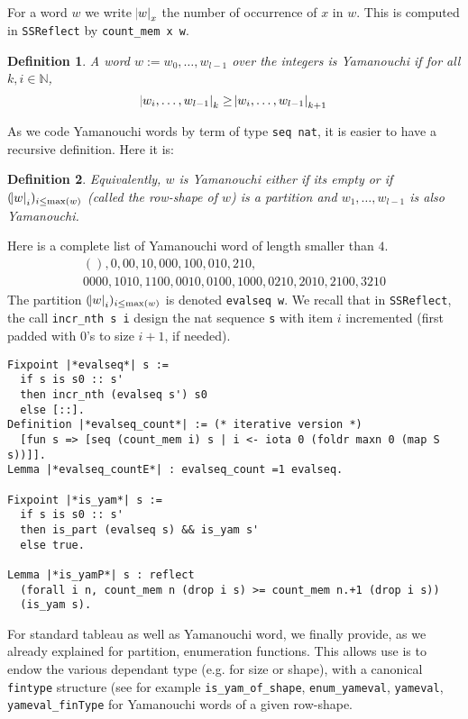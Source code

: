 \documentclass[12pt,a4paper]{article}
\let\verb=\lstinline
\newcommand{\SSR}{\texttt{SSReflect}\xspace}
\newcommand{\N}{{\mathbb N}}
\newtheorem{DEFN}{Definition}
\begin{document}
For a word $w$ we write $\abs{w}_x$ the number of occurrence of $x$ in
$w$. This is computed in \SSR by \verb{count_mem x w}.
\begin{DEFN}
  A word $w := w_0,\dots,w_{l-1}$ over the integers is \emph{Yamanouchi} if for
  all $k, i \in \N$,
  \[ \abs{w_i,\dots,w_{l-1}}_k \geq \abs{w_i,\dots,w_{l-1}}_{k+1} \]
\end{DEFN}
As we code Yamanouchi words by term of type \verb{seq nat}, it is easier
to have a recursive definition. Here it is:
\begin{DEFN}
  Equivalently, $w$ is \emph{Yamanouchi} either if its empty or if
  $(\abs{w}_i)_{i\leq\max(w)}$ (called the row-shape of $w$) is a partition
  and $w_1,\dots,w_{l-1}$ is also Yamanouchi.
\end{DEFN}
Here is a complete list of Yamanouchi word of length smaller than $4$.
\begin{gather*}
  (), 0, 00, 10, 000, 100, 010, 210, \\
  0000, 1010, 1100, 0010, 0100, 1000, 0210, 2010, 2100, 3210
\end{gather*}
The partition $(\abs{w}_i)_{i\leq\max(w)}$ is denoted \verb|evalseq w|.
 We recall that in \SSR, the call \verb{incr_nth s i} design the nat
sequence \verb|s| with item $i$ incremented (first padded with 0's to
size $i+1$, if needed).

  \begin{lstlisting}
Fixpoint |*evalseq*| s :=
  if s is s0 :: s'
  then incr_nth (evalseq s') s0
  else [::].
Definition |*evalseq_count*| := (* iterative version *)
  [fun s => [seq (count_mem i) s | i <- iota 0 (foldr maxn 0 (map S s))]].
Lemma |*evalseq_countE*| : evalseq_count =1 evalseq.

Fixpoint |*is_yam*| s :=
  if s is s0 :: s'
  then is_part (evalseq s) && is_yam s'
  else true.

Lemma |*is_yamP*| s : reflect
  (forall i n, count_mem n (drop i s) >= count_mem n.+1 (drop i s))
  (is_yam s).
\end{lstlisting}

For standard tableau as well as Yamanouchi word, we finally provide, as we
already explained for partition, enumeration functions. This allows use is to
endow the various dependant type (e.g. for size or shape), with a canonical
\verb{fintype} structure (see for example \verb{is_yam_of_shape},
\verb{enum_yameval}, \verb{yameval}, \verb{yameval_finType} for
Yamanouchi words of a given row-shape.
\end{document}
